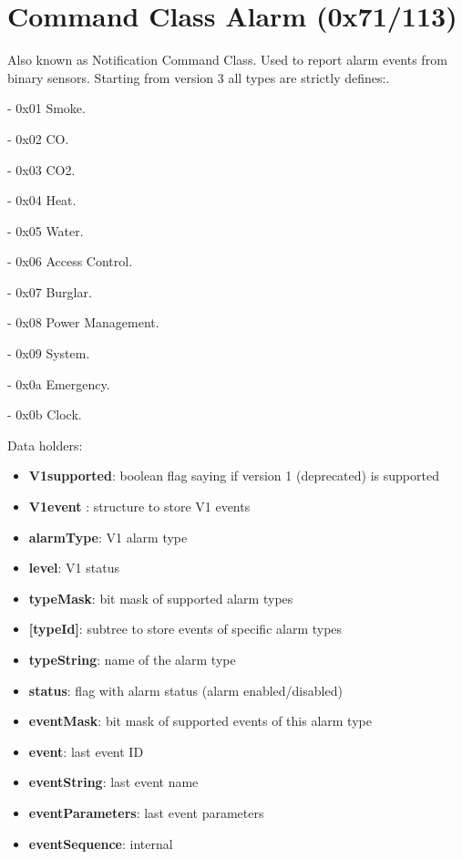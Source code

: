 \section{Command Class Alarm (0x71/113)}

Also known as Notification Command Class. Used to report alarm events from binary sensors. Starting from version 3 all types are strictly defines:. 

- 0x01 Smoke. 

- 0x02 CO. 

- 0x03 CO2. 

- 0x04 Heat. 

- 0x05 Water. 

- 0x06 Access Control. 

- 0x07 Burglar. 

- 0x08 Power Management. 

- 0x09 System. 

- 0x0a Emergency. 

- 0x0b Clock.
\newline

\noindent
Data holders:

\begin{itemize}
\item \textbf{V1supported}: boolean flag saying if version 1 (deprecated) is supported
\item \textbf{V1event }: structure to store V1 events
\item \qquad\textbf{alarmType}: V1 alarm type
\item \qquad\textbf{level}: V1 status
\item \textbf{typeMask}: bit mask of supported alarm types
\item \textbf{[typeId]}: subtree to store events of specific alarm types
\item \qquad\textbf{typeString}: name of the alarm type
\item \qquad\textbf{status}: flag with alarm status (alarm enabled/disabled)
\item \qquad\textbf{eventMask}: bit mask of supported events of this alarm type
\item \qquad\textbf{event}: last event ID
\item \qquad\textbf{eventString}: last event name
\item \qquad\textbf{eventParameters}: last event parameters
\item \qquad\textbf{eventSequence}: internal
\end{itemize}

